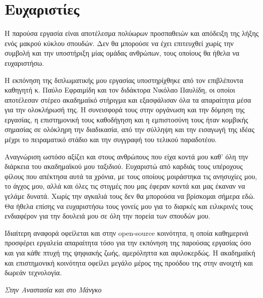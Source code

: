 \chapter*{Ευχαριστίες}
Η παρούσα εργασία είναι αποτέλεσμα πολύωρων προσπαθειών και απόδειξη της λήξης ενός μακρού κύκλου σπουδών. Δεν θα μπορούσε να έχει επιτευχθεί χωρίς την συμβολή και την υποστήριξη μίας ομάδας ανθρώπων, τους οποίους θα ήθελα να ευχαριστήσω.

Η εκπόνηση της διπλωματικής μου εργασίας υποστηρίχθηκε από τον επιβλέποντα καθηγητή κ. Παύλο Εφραιμίδη και τον διδάκτορα Νικόλαο Παυλίδη, οι οποίοι αποτέλεσαν στέρεο ακαδημαϊκό στήριγμα και εξασφάλισαν όλα τα απαραίτητα μέσα για την ολοκλήρωσή της. Η συνεισφορά τους στην οργάνωση και την δόμηση της εργασίας, η επιστημονική τους καθοδήγηση και η εμπιστοσύνη τους ήταν κομβικής σημασίας σε ολόκληρη την διαδικασία, από την σύλληψη και την εισαγωγή της ιδέας μέχρι το πειραματικό στάδιο και την συγγραφή του τελικού παραδοτέου.

Αναγνώριση ωστόσο αξίζει και στους ανθρώπους που είχα κοντά μου καθ’ όλη την διάρκεια του ακαδημαϊκού μου ταξιδιού. Ευχαριστώ από καρδιάς τους υπέροχους φίλους που απέκτησα αυτά τα χρόνια, με τους οποίους μοιράστηκα τις ανησυχίες μου, το άγχος μου, αλλά και όλες τις στιγμές που μας έφεραν κοντά και μας έκαναν να γελάμε δυνατά. Χωρίς την αγκαλιά τους δεν θα μπορούσα να βρίσκομαι σήμερα εδώ. Θα ήθελα επίσης να ευχαριστήσω τους γονείς μου για το διαρκές και ειλικρινές τους ενδιαφέρον για την δουλειά μου σε όλη την πορεία των σπουδών μου.

Ιδιαίτερη αναφορά οφείλεται και στην open-source κοινότητα, η οποία καθημερινά προσφέρει εργαλεία απαραίτητα τόσο για την εκπόνηση της παρούσας εργασίας όσο και για κάθε πτυχή της ψηφιακής ζωής, αμερόληπτα και αφιλοκερδώς. Η ακαδημαϊκή και επιστημονική κοινότητα οφείλει μεγάλο μέρος της προόδου της στην ανοιχτή και δωρεάν τεχνολογία.
\newpage
\vspace{4 em}
\begin{flushright}
    \emph{Στην Αναστασία και στο Μάνγκο}
\end{flushright}